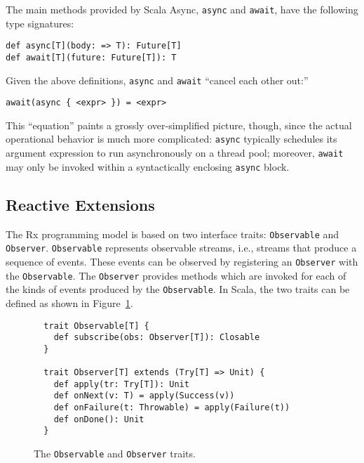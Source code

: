 \documentclass{acm_proc_article-sp}
\begin{document}
The main methods provided by Scala Async, \verb|async| and \verb|await|, have
the following type signatures:

\lstset{numbers=none,xleftmargin=0em}
\begin{lstlisting}
def async[T](body: => T): Future[T]
def await[T](future: Future[T]): T
\end{lstlisting}

Given the above definitions, \verb|async| and \verb|await| ``cancel each other
out:''

\begin{lstlisting}
await(async { <expr> }) = <expr>
\end{lstlisting}

This ``equation'' paints a grossly over-simplified picture, though, since the
actual operational behavior is much more complicated: \verb|async| typically
schedules its argument expression to run asynchronously on a thread pool;
moreover, \verb|await| may only be invoked within a syntactically enclosing
\verb|async| block.


\subsection{Reactive Extensions}

The Rx programming model is based on two interface traits: \verb|Observable|
and \verb|Observer|. \verb|Observable| represents observable streams, i.e.,
streams that produce a sequence of events. These events can be observed by
registering an \verb|Observer| with the \verb|Observable|. The \verb|Observer|
provides methods which are invoked for each of the kinds of events produced by
the \verb|Observable|. In Scala, the two traits can be defined as shown in
Figure~\ref{fig:observable-observer}.

\begin{figure}[ht!]
  \centering
  \lstset{numbers=none,xleftmargin=0em}
  \begin{lstlisting}
  trait Observable[T] {
    def subscribe(obs: Observer[T]): Closable
  }

  trait Observer[T] extends (Try[T] => Unit) {
    def apply(tr: Try[T]): Unit
    def onNext(v: T) = apply(Success(v))
    def onFailure(t: Throwable) = apply(Failure(t))
    def onDone(): Unit
  }
  \end{lstlisting}
  \caption{The \texttt{Observable} and \texttt{Observer} traits.}
  \label{fig:observable-observer}
\end{figure}
\end{document}
